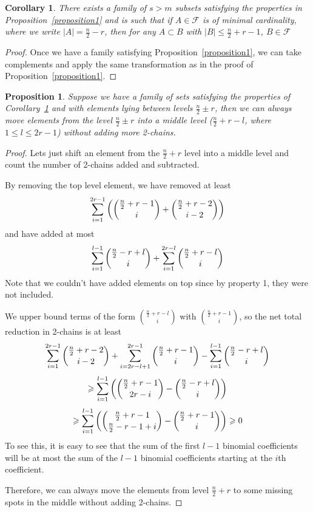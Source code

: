 \documentclass[12pt]{article}
\theoremstyle{plain}
\newtheorem{corollary}[theorem]{Corollary}
\newtheorem{proposition}[theorem]{Proposition}
\theoremstyle{definition}
\theoremstyle{remark}
\newcommand{\F}{\mathcal{F}}
\begin{document}
\begin{corollary}
\label{cor1}
There exists a family of $s > m$ subsets satisfying the properties in Proposition~\ref{proposition1} and is such that if $A \in \F$ is of minimal cardinality, where we write $|A|=\frac{n}{2}-r$, then for any $A \subset B$ with $|B| \leq \frac{n}{2}+r-1$, $B \in \F$
\end{corollary}

\begin{proof}
Once we have a family satisfying Proposition~\ref{proposition1}, we can take complements and apply the same transformation as in the proof of Proposition~\ref{proposition1}.
\end{proof}

\begin{proposition}
\label{proposition2}
Suppose we have a family of sets satisfying the properties of Corollary~\ref{cor1} and with elements lying between levels $\frac{n}{2}\pm r$, then we can always move elements from the level $\frac{n}{2} \pm r$ into a middle level ($\frac{n}{2} + r - l$, where $1 \leq l \leq 2r-1$) without adding more 2-chains. 
\end{proposition}

\begin{proof}
Lets just shift an element from the $\frac{n}{2} + r$ level into a middle level and count the number of 2-chains added and subtracted. 

By removing the top level element, we have removed at least
\[ \sum_{i=1}^{2r-1} \left(\dbinom{\frac{n}{2} +r-1}{i} + \dbinom{\frac{n}{2} + r-2}{i-2}\right) \]
and have added at most
\[ \sum_{i=1}^{l-1}\dbinom{\frac{n}{2}-r + l}{i} + \sum_{i=1}^{2r-l} \dbinom{\frac{n}{2}+r-l}{i} \]
Note that we couldn't have added elements on top since by property 1, they were not included.

We upper bound terms of the form $\binom{\frac{n}{2}+r-l}{i}$ with $\binom{\frac{n}{2}+r-1}{i}$, so the net total reduction in 2-chains is at least
\[ \sum_{i=1}^{2r-1} \dbinom{\frac{n}{2}+r-2}{i-2} + \sum_{i=2r-l+1}^{2r-1} \dbinom{\frac{n}{2}+r-1}{i} - \sum_{i=1}^{l-1} \dbinom{\frac{n}{2}-r+l}{i}\]
\[ \geq \sum_{i=1}^{l-1} \left(\dbinom{\frac{n}{2}+r-1}{2r-i} - \dbinom{\frac{n}{2}-r+l}{i}\right) \]
\[ \geq \sum_{i=1}^{l-1} \left(\dbinom{\frac{n}{2}+r-1}{\frac{n}{2}-r-1+i} - \dbinom{\frac{n}{2}+r-1}{i}\right) \geq 0 \]
To see this, it is easy to see that the sum of the first $l-1$ binomial coefficients will be at most the sum of the $l-1$ binomial coefficients starting at the $i$th coefficient.

Therefore, we can always move the elements from level $\frac{n}{2}+r$ to some missing spots in the middle without adding 2-chains. 
\end{proof}
\end{document}
